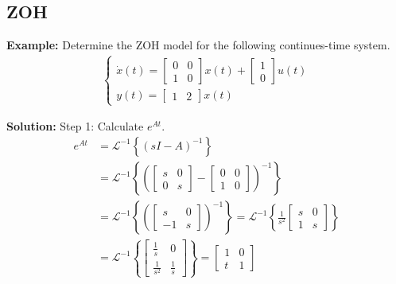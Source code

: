 \begin{multicols}{2}
\subsection{ZOH}
\textbf{Example:}
Determine the ZOH model for the following continues-time system.
\begin{align*}
    \begin{cases}
    \dot{x}(t) = \begin{bmatrix} 0 & 0 \\ 1 & 0 \end{bmatrix}x(t) + \begin{bmatrix} 1 \\ 0 \end{bmatrix}u(t) \\
    y(t) = \begin{bmatrix} 1 & 2 \end{bmatrix}x(t)
    \end{cases}
\end{align*}

\textbf{Solution:}
Step 1: Calculate $e^{At}$.
\begin{align*}
    e^{At} &= \mathcal{L}^{-1}\left\{ (sI-A)^{-1} \right\} \\
    &= \mathcal{L}^{-1}\left\{ \left(\begin{bmatrix} s & 0 \\ 0 & s \end{bmatrix}-\begin{bmatrix} 0 & 0 \\ 1 & 0 \end{bmatrix}\right)^{-1} \right\} \\
    &= \mathcal{L}^{-1}\left\{ \left(\begin{bmatrix} s & 0 \\ -1 & s \end{bmatrix}\right)^{-1} \right\} 
    = \mathcal{L}^{-1}\left\{ \frac{1}{s^2}\begin{bmatrix} s & 0 \\ 1 & s \end{bmatrix} \right\} \\
    &= \mathcal{L}^{-1}\left\{ \begin{bmatrix} \frac{1}{s} & 0 \\ \frac{1}{s^2} & \frac{1}{s} \end{bmatrix} \right\}
    = \begin{bmatrix} 1 & 0 \\ t & 1 \end{bmatrix} 
\end{align*}


\end{multicols}
